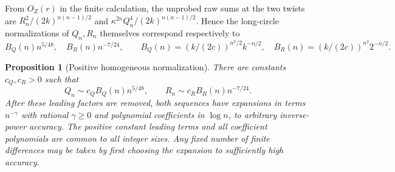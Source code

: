 \documentclass[11pt]{article}
\numberwithin{equation}{section}
\newtheorem{proposition}[theorem]{Proposition}
\theoremstyle{definition}\newtheorem{definition}[theorem]{Definition}
\theoremstyle{remark}\newtheorem{remark}[theorem]{Remark}
\begin{document}
From \(O_Z(r)\) in the finite calculation, the unprobed raw sums at the two twists are \(R_n^2/(2k)^{n(n-1)/2}\) and \(\kappa^{2n}Q_n^4/(2k)^{n(n-1)/2}\). Hence the long-circle normalizations of \(Q_n,R_n\) themselves correspond respectively to
\[
 B_Q(n)n^{5/48},\quad B_R(n)n^{-7/24},\qquad
 B_Q(n)=(k/(2c))^{n^2/2}k^{-n/2},\quad B_R(n)=(k/(2c))^{n^2}2^{-n/2}.
\]
\begin{proposition}[Positive homogeneous normalization]\label{L:prop:positive-normalization}
There are constants $c_Q,c_R>0$ such that
\[
 Q_n\sim c_Q B_Q(n)n^{5/48},\qquad
 R_n\sim c_R B_R(n)n^{-7/24}.
\]
After these leading factors are removed, both sequences have expansions
in terms $n^{-\gamma}$ with rational $\gamma\ge0$ and polynomial
coefficients in $\log n$, to arbitrary inverse-power accuracy. The positive
constant leading terms and all coefficient polynomials are common to all
integer sizes. Any fixed number of finite differences may be taken by
first choosing the expansion to sufficiently high accuracy.
\end{proposition}
\end{document}
